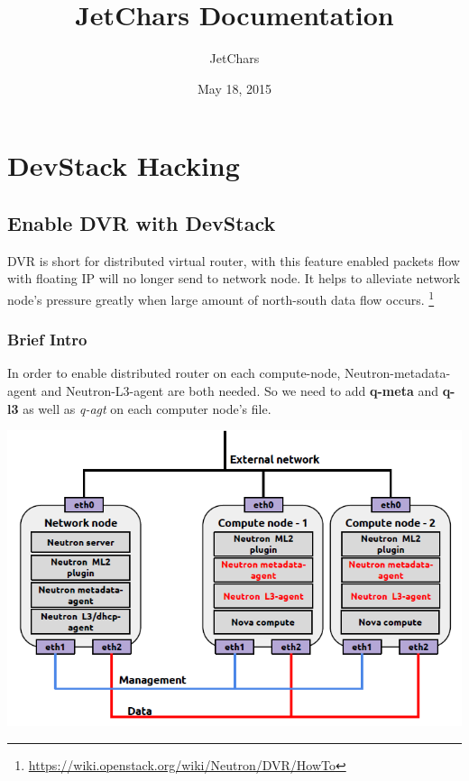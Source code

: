 \documentclass[letterpaper,10pt,english]{sphinxmanual}
\title{JetChars Documentation}
\date{May 18, 2015}
\author{JetChars}
\begin{document}
\maketitle
\tableofcontents
{}\label{index::doc}



\chapter{DevStack Hacking}
\label{index:welcome-to-jetchars-s-documentation}\label{index:devstack-hacking}

\section{Enable DVR with DevStack}
\label{docs/enable_dvr_with_devstack/index:enable-dvr-with-devstack}\label{docs/enable_dvr_with_devstack/index::doc}
DVR is short for distributed virtual router, with this feature enabled packets flow with floating IP will no longer send to network node. It helps to alleviate network node's pressure greatly when large amount of north-south data flow occurs. \footnote{
\href{https://wiki.openstack.org/wiki/Neutron/DVR/HowTo}{https://wiki.openstack.org/wiki/Neutron/DVR/HowTo}
}


\subsection{Brief Intro}
\label{docs/enable_dvr_with_devstack/index:brief-intro}
In order to enable distributed router on each compute-node, Neutron-metadata-agent and Neutron-L3-agent are both needed. So we need to add \textbf{q-meta} and \textbf{q-l3} as well as \emph{q-agt} on each computer node's  file.

\includegraphics{image1.png}
\end{document}
